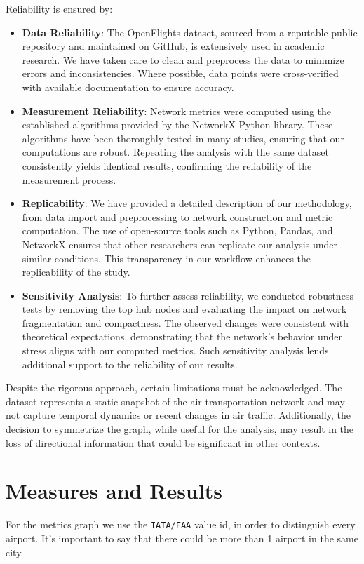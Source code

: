 \documentclass[12pt]{article}
\begin{document}
    Reliability is ensured by:
    \begin{itemize}
        \item \textbf{Data Reliability}: The OpenFlights dataset, sourced from a reputable public repository and maintained on GitHub, is extensively used in academic research. We have taken care to clean and preprocess the data to minimize errors and inconsistencies. Where possible, data points were cross-verified with available documentation to ensure accuracy.

        \item \textbf{Measurement Reliability}: Network metrics were computed using the established algorithms provided by the NetworkX Python library. These algorithms have been thoroughly tested in many studies, ensuring that our computations are robust. Repeating the analysis with the same dataset consistently yields identical results, confirming the reliability of the measurement process.

        \item \textbf{Replicability}: We have provided a detailed description of our methodology, from data import and preprocessing to network construction and metric computation. The use of open-source tools such as Python, Pandas, and NetworkX ensures that other researchers can replicate our analysis under similar conditions. This transparency in our workflow enhances the replicability of the study.

        \item \textbf{Sensitivity Analysis}: To further assess reliability, we conducted robustness tests by removing the top hub nodes and evaluating the impact on network fragmentation and compactness.
        The observed changes were consistent with theoretical expectations, demonstrating that the network's behavior under stress aligns with our computed metrics.
        Such sensitivity analysis lends additional support to the reliability of our results.

    \end{itemize}

    Despite the rigorous approach, certain limitations must be acknowledged. The dataset represents a static snapshot of the air transportation network and may not capture temporal dynamics or recent changes in air traffic. Additionally, the decision to symmetrize the graph, while useful for the analysis, may result in the loss of directional information that could be significant in other contexts.


    \section{Measures and Results}\label{sec:measures-and-results}
    For the metrics graph we use the \texttt{IATA/FAA} value id, in order to distinguish every airport. It's important to say that there could be more than 1 airport in the same city.
\end{document}
